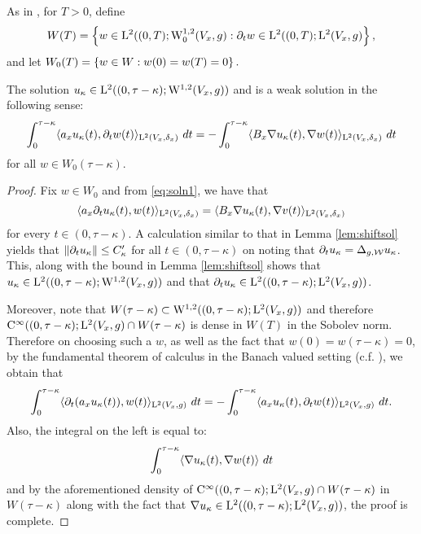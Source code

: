 \documentclass[a4paper, 12pt]{amsart}
\begin{document}
As in \cite{CS}, for $T > 0$, define 
$$ W(T) = \set{ w \in \Lp{2}( (0,T); \SobH[0]{1}(V_x,g): \partial_t w \in \Lp{2}((0,T); \Lp{2}(V_x, g)},$$
and let $W_0(T) = \set{ w \in W: w(0) = w(T) = 0}.$

\begin{lemma}
\label{Lem:testfn2} 
The solution $u_\kappa \in \Lp{2}((0, \tau - \kappa); \SobH{1}(V_x, g))$
and is a weak solution in the following sense:
\begin{equation}
\label{eq:testfn2} 
\int_{0}^{\tau - \kappa} \inprod{a_x u_\kappa(t), \partial_t w(t)}_{\Lp{2}(V_x,\delta_x)}\ dt 
		= -\int_{0}^{\tau - \kappa } \inprod{B_x \nabla u_\kappa(t), \nabla w(t)}_{\Lp{2}(V_x, \delta_x)}\ dt
\end{equation}
for all $w \in W_0(\tau - \kappa)$.
\end{lemma}
\begin{proof}
Fix $w \in W_0$ and from \eqref{eq:soln1}, we have that
$$\inprod{a_x \partial_t u_\kappa (t), w(t)}_{\Lp{2}(V_x, \delta_x)} 
		= \inprod{ B_x \nabla u_\kappa(t), \nabla v(t)}_{\Lp{2}(V_x, \delta_x)}$$
for every $t \in (0, \tau - \kappa)$.
A calculation similar to that in Lemma \ref{lem:shiftsol} 
yields that $\norm{ \partial_t u_\kappa} \leq C_\kappa'$
for all $t \in (0, \tau - \kappa)$
on noting that $\partial_t u_\kappa = \Delta_{g,\cW} u_\kappa$.
This, along with the bound in Lemma \ref{lem:shiftsol}
shows that  $u_\kappa \in \Lp{2}((0, \tau - \kappa); \SobH{1}(V_x, g))$
and that $\partial_t u_\kappa \in \Lp{2}((0,\tau - \kappa); \Lp{2}(V_x, g))$. 

Moreover, note that $W(\tau- \kappa) \subset \SobH{1}((0,\tau-\kappa); \Lp{2}(V_x,g))$
and therefore $\Ck{\infty}((0,\tau-\kappa); \Lp{2}(V_x,g) \intersect W(\tau - \kappa)$
is dense in $W(T)$ in the Sobolev norm. Therefore on 
choosing such a $w$, as well as the fact that $w(0) = w(\tau - \kappa) = 0$, 
by the fundamental theorem of calculus in the Banach 
valued setting (c.f. \cite{}), we obtain that
$$\int_{0}^{\tau - \kappa} \inprod{ \partial_t(a_x u_\kappa(t)), w(t)}_{\Lp{2}(V_x,g)}\ dt
	= - \int_0^{\tau - \kappa} \inprod{a_x u_\kappa(t), \partial_t w(t)}_{\Lp{2}(V_x, g)}\ dt.$$
Also, the integral on the left is equal to:
$$\int_{0}^{\tau - \kappa} \inprod{ \nabla u_\kappa(t), \nabla w(t)}\ dt$$
and by the aforementioned density of
 $\Ck{\infty}((0,\tau-\kappa); \Lp{2}(V_x,g) \intersect W(\tau - \kappa)$ 
in $W(\tau - \kappa)$ along with the fact that $\nabla u_\kappa \in \Lp{2}((0, \tau - \kappa); \Lp{2}(V_x,g))$,
the proof is complete.
\end{proof} 
\end{document}
